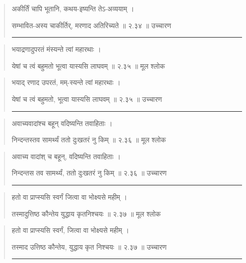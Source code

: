 \begin{quotation}

अकीर्तिं चापि भूतानि, कथय-इष्यन्ति तेऽ-अव्ययाम्‌  ।  

सम्भावित-अस्य चाकीर्तिर्, मरणाद अतिरिच्यते  ॥ २.३४ ॥  उच्चारण

\noindent\rule{16cm}{0.4pt} 
\end{quotation}


\begin{quotation}

भयाद्रणादुपरतं मंस्यन्ते त्वां महारथाः  ।  

येषां च त्वं बहुमतो भूत्वा यास्यसि लाघवम्‌  ॥ २.३५ ॥  मूल श्लोक
\end{quotation}

\begin{quotation}

भयाद् रणाद उपरतं, मम्-स्यन्ते त्वां महारथाः  ।  

येषां च त्वं बहुमतो, भूत्वा यास्यसि लाघवम्‌  ॥ २.३५ ॥  उच्चारण

\noindent\rule{16cm}{0.4pt} 
\end{quotation}


\begin{quotation}

अवाच्यवादांश्च बहून्‌ वदिष्यन्ति तवाहिताः  ।  

निन्दन्तस्तव सामर्थ्यं ततो दुःखतरं नु किम्‌  ॥ २.३६ ॥  मूल श्लोक
\end{quotation}

\begin{quotation}

अवाच्य वादांश् च बहून्,‌ वदिष्यन्ति तवाहिताः  ।  

निन्दन्तस तव सामर्थ्यं, ततो दुःखतरं नु किम्‌  ॥ २.३६ ॥  उच्चारण

\noindent\rule{16cm}{0.4pt} 
\end{quotation}


\begin{quotation}

हतो वा प्राप्स्यसि स्वर्गं जित्वा वा भोक्ष्यसे महीम्‌  ।  

तस्मादुत्तिष्ठ कौन्तेय युद्धाय कृतनिश्चयः  ॥ २.३७ ॥  मूल श्लोक
\end{quotation}

\begin{quotation}

हतो वा प्राप्स्यसि स्वर्गं, जित्वा वा भोक्ष्यसे महीम्‌  ।  

तस्माद उत्तिष्ठ कौन्तेय, युद्धाय कृत निश्चयः  ॥ २.३७ ॥  उच्चारण

\noindent\rule{16cm}{0.4pt} 
\end{quotation}



